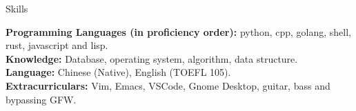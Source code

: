 \documentclass{resume} %
\begin{document}
\begin{rSection}{Skills}

{\bf Programming Languages (in proficiency order):} python, cpp, golang, shell, rust, javascript and lisp.
\\ {\bf Knowledge:} Database, operating system, algorithm, data structure.
\\ {\bf Language:} Chinese (Native), English (TOEFL 105).
\\ {\bf Extracurriculars:} Vim, Emacs, VSCode, Gnome Desktop, guitar, bass and bypassing GFW.

\end{rSection}
\end{document}

